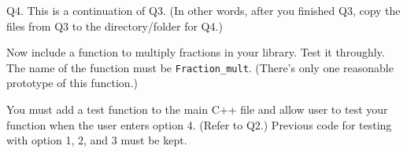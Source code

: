 
Q4. This is a continuation of Q3.
(In other words, after you finished Q3, copy the files from Q3
to the directory/folder for Q4.)

Now include a function to multiply fractions in your library.
Test it throughly.
The name of the function must be \verb!Fraction_mult!.
(There's only one reasonable prototype of this function.)

You must add a test function to the main C++ file and allow user to test
your function when the user enters option 4. (Refer to Q2.)
Previous code for testing with option 1, 2, and 3 must be kept.


